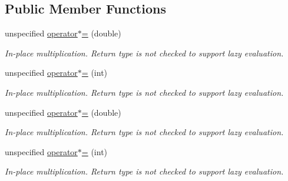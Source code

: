 \subsection*{Public Member Functions}
\begin{DoxyCompactItemize}
\item 
\hypertarget{structRFFGen_1_1Concepts_1_1MultiplyWithArithmeticFromLeftConcept_ac7becd3ba4b0a7f81c2f83bfef9bad8c}{unspecified \hyperlink{structRFFGen_1_1Concepts_1_1MultiplyWithArithmeticFromLeftConcept_ac7becd3ba4b0a7f81c2f83bfef9bad8c}{operator$\ast$=} (double)}\label{structRFFGen_1_1Concepts_1_1MultiplyWithArithmeticFromLeftConcept_ac7becd3ba4b0a7f81c2f83bfef9bad8c}

\begin{DoxyCompactList}\small\item\em In-\/place multiplication. Return type is not checked to support lazy evaluation. \end{DoxyCompactList}\item 
\hypertarget{structRFFGen_1_1Concepts_1_1MultiplyWithArithmeticFromLeftConcept_af46b7b8e72ef559e6667e104ec745359}{unspecified \hyperlink{structRFFGen_1_1Concepts_1_1MultiplyWithArithmeticFromLeftConcept_af46b7b8e72ef559e6667e104ec745359}{operator$\ast$=} (int)}\label{structRFFGen_1_1Concepts_1_1MultiplyWithArithmeticFromLeftConcept_af46b7b8e72ef559e6667e104ec745359}

\begin{DoxyCompactList}\small\item\em In-\/place multiplication. Return type is not checked to support lazy evaluation. \end{DoxyCompactList}\item 
\hypertarget{structRFFGen_1_1Concepts_1_1MultiplyWithArithmeticFromLeftConcept_ac7becd3ba4b0a7f81c2f83bfef9bad8c}{unspecified \hyperlink{structRFFGen_1_1Concepts_1_1MultiplyWithArithmeticFromLeftConcept_ac7becd3ba4b0a7f81c2f83bfef9bad8c}{operator$\ast$=} (double)}\label{structRFFGen_1_1Concepts_1_1MultiplyWithArithmeticFromLeftConcept_ac7becd3ba4b0a7f81c2f83bfef9bad8c}

\begin{DoxyCompactList}\small\item\em In-\/place multiplication. Return type is not checked to support lazy evaluation. \end{DoxyCompactList}\item 
\hypertarget{structRFFGen_1_1Concepts_1_1MultiplyWithArithmeticFromLeftConcept_af46b7b8e72ef559e6667e104ec745359}{unspecified \hyperlink{structRFFGen_1_1Concepts_1_1MultiplyWithArithmeticFromLeftConcept_af46b7b8e72ef559e6667e104ec745359}{operator$\ast$=} (int)}\label{structRFFGen_1_1Concepts_1_1MultiplyWithArithmeticFromLeftConcept_af46b7b8e72ef559e6667e104ec745359}

\begin{DoxyCompactList}\small\item\em In-\/place multiplication. Return type is not checked to support lazy evaluation. \end{DoxyCompactList}\end{DoxyCompactItemize}


